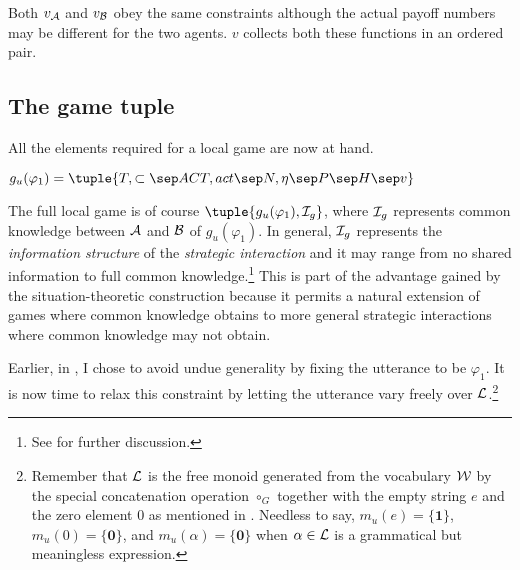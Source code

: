 Both $v_{\cal A}$ and $v_{\cal B}$ obey the same constraints although the actual payoff numbers may be different for the two agents. $v$ collects both these functions in an ordered pair.

%


\subsection{The game tuple}\label{sec:A.4.7}

All the elements required for a local game are now at hand. 


\begin{definition} $g_u(\varphi_1) = \tuple{T,\subset \sep ACT,act \sep N,\eta \sep P \sep H \sep v}$ \end{definition}


\noindent The full local game is of course $\tuple{g_u(\varphi_1), {\cal I}_g}$, where ${\cal I}_g$ represents common knowledge between $\cal A$ and $\cal B$ of $g_u(\varphi_1)$. In general, ${\cal I}_g$ represents the \emph{information structure} of the \emph{strategic interaction} and it may range from no shared information to full common knowledge.\footnote{See \citet[Section~3.3.4]{parikh:le} for further discussion.} This is part of the advantage gained by the situation-theoretic construction because it permits a natural extension of games where common knowledge obtains to more general strategic interactions where common knowledge may not obtain.

Earlier, in , I chose to avoid undue generality by fixing the utterance to be 
$\varphi_1$. It is now time to relax this constraint by letting the utterance vary freely over  $\cal L$.\footnote{Remember that $\cal L$ is the free monoid generated from the vocabulary $\cal W$ by the special concatenation operation $\circ_G$ together with the empty string $e$ and the zero element $0$ as mentioned in . Needless to say, $m_u(e) = \{\mathbf{1}\}$, $m_u(0) = \{\mathbf{0}\}$, and $m_u(\alpha) = \{\mathbf{0}\}$ when $\alpha \in {\cal L}$ is a grammatical but meaningless expression.}

